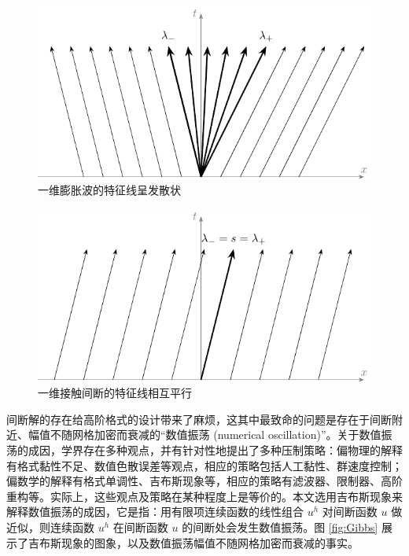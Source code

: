 \begin{figure}[h!]
\begin{centering}
\includegraphics[width=1\textheight,height=0.26\textheight,keepaspectratio]{figures/expansion}
\par\end{centering}
\caption{\label{fig:expansion}一维膨胀波的特征线呈发散状}
\end{figure}

\begin{figure}[h!]
\begin{centering}
\includegraphics[width=1\textheight,height=0.26\textheight,keepaspectratio]{figures/contact}
\par\end{centering}
\caption{\label{fig:contact}一维接触间断的特征线相互平行}
\end{figure}

间断解的存在给高阶格式的设计带来了麻烦，这其中最致命的问题是存在于间断附近、幅值不随网格加密而衰减的“数值振荡 (numerical
oscillation)”。关于数值振荡的成因，学界存在多种观点，并有针对性地提出了多种压制策略：偏物理的解释有格式黏性不足、数值色散误差等观点，相应的策略包括人工黏性、群速度控制；偏数学的解释有格式单调性、吉布斯现象等，相应的策略有滤波器、限制器、高阶重构等。实际上，这些观点及策略在某种程度上是等价的。本文选用吉布斯现象来解释数值振荡的成因，它是指：用有限项连续函数的线性组合
$u^{h}$ 对间断函数 $u$ 做近似，则连续函数 $u^{h}$ 在间断函数 $u$ 的间断处会发生数值振荡。图 \ref{fig:Gibbs}
展示了吉布斯现象的图象，以及数值振荡幅值不随网格加密而衰减的事实。

